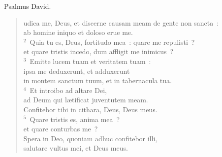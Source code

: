 \bchapter[Psalm]
Psalmus David. \begin{verse}udica me, Deus, et discerne causam meam de gente non sancta~:\\ ab homine iniquo et doloso erue me.\\
${}^{2}$~Quia tu es, Deus, fortitudo mea~: quare me repulisti~?\\ et quare tristis incedo, dum affligit me inimicus~?\\
${}^{3}$~Emitte lucem tuam et veritatem tuam~:\\ ipsa me deduxerunt, et adduxerunt\\ in montem sanctum tuum, et in tabernacula tua.\\
${}^{4}$~Et introibo ad altare Dei,\\ ad Deum qui l\ae tificat juventutem meam.\\ Confitebor tibi in cithara, Deus, Deus meus.\\
${}^{5}$~Quare tristis es, anima mea~?\\ et quare conturbas me~?\\ Spera in Deo, quoniam adhuc confitebor illi,\\ salutare vultus mei, et Deus meus.\end{verse}




